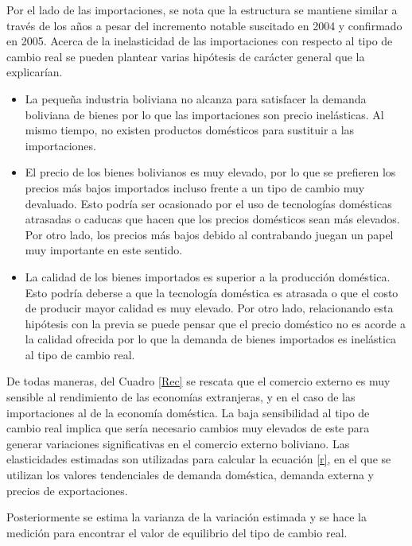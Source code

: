 \documentclass[12pt,letterpaper]{article}
\begin{document}
Por el lado de las importaciones, se nota que la estructura se mantiene similar a través de los años a pesar del incremento notable suscitado en 2004 y confirmado en 2005. Acerca de la inelasticidad de las importaciones con respecto al tipo de cambio real se pueden plantear varias hipótesis de carácter general que la explicarían.
\begin{itemize}
\item La pequeña industria boliviana no alcanza para satisfacer la demanda boliviana de bienes por lo que las importaciones son precio inelásticas. Al mismo tiempo, no existen productos domésticos para sustituir a las importaciones.
\item El precio de los bienes bolivianos es muy elevado, por lo que se prefieren los precios más bajos importados incluso frente a un tipo de cambio muy devaluado. Esto podría ser ocasionado por el uso de tecnologías domésticas atrasadas o caducas que hacen que los precios domésticos sean más elevados. Por otro lado, los precios más bajos debido al contrabando juegan un papel muy importante en este sentido.
\item La calidad de los bienes importados es superior a la producción doméstica. Esto podría deberse a que la tecnología doméstica es atrasada o que el costo de producir mayor calidad es muy elevado. Por otro lado, relacionando esta hipótesis con la previa se puede pensar que el precio doméstico no es acorde a la calidad ofrecida por lo que la demanda de bienes importados es inelástica al tipo de cambio real. 
\end{itemize}

De todas maneras, del Cuadro \ref{Rec} se rescata que el comercio externo es muy sensible al rendimiento de las economías extranjeras, y en el caso de las importaciones al de la economía doméstica. La baja sensibilidad al tipo de cambio real implica que sería necesario cambios muy elevados de este para generar variaciones significativas en el comercio externo boliviano. Las elasticidades estimadas son utilizadas para calcular la ecuación \ref{r}, en el que se utilizan los valores tendenciales de demanda doméstica, demanda externa y precios de exportaciones.

Posteriormente se estima la varianza de la variación estimada y se hace la medición para encontrar el valor de equilibrio del tipo de cambio real.
\end{document}
